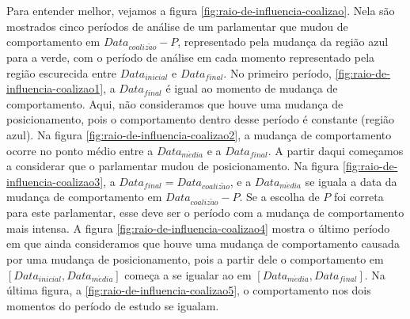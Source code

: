 \documentclass[a4paper,titlepage]{ppgi}\usepackage[]{graphicx}\usepackage[]{color}
\begin{document}
Para entender melhor, vejamos a figura \ref{fig:raio-de-influencia-coalizao}.
Nela são mostrados cinco períodos de análise de um parlamentar que mudou de
comportamento em $Data_{coaliz\tilde{a}o} - P$, representado pela mudança da
região azul para a verde, com o período de análise em cada momento representado
pela região escurecida entre $Data_{inicial}$ e $Data_{final}$. No primeiro
período, \ref{fig:raio-de-influencia-coalizao1}, a $Data_{final}$ é igual ao
momento de mudança de comportamento. Aqui, não consideramos que houve uma
mudança de posicionamento, pois o comportamento dentro desse período é
constante (região azul). Na figura \ref{fig:raio-de-influencia-coalizao2}, a
mudança de comportamento ocorre no ponto médio entre a $Data_{m\acute{e}dia}$ e
a $Data_{final}$. A partir daqui começamos a considerar que o parlamentar mudou
de posicionamento. Na figura \ref{fig:raio-de-influencia-coalizao3}, a
$Data_{final} = Data_{coaliz\tilde{a}o}$, e a $Data_{m\acute{e}dia}$ se iguala
a data da mudança de comportamento em $Data_{coaliz\tilde{a}o} - P$. Se a
escolha de $P$ foi correta para este parlamentar, esse deve ser o período com a
mudança de comportamento mais intensa. A figura
\ref{fig:raio-de-influencia-coalizao4} mostra o último período em que ainda
consideramos que houve uma mudança de comportamento causada por uma mudança de
posicionamento, pois a partir dele o comportamento em $\left[Data_{inicial},
Data_{m\acute{e}dia}\right]$ começa a se igualar ao em
$\left[Data_{m\acute{e}dia}, Data_{final}\right]$. Na última figura, a
\ref{fig:raio-de-influencia-coalizao5}, o comportamento nos dois momentos do
período de estudo se igualam.
\end{document}

